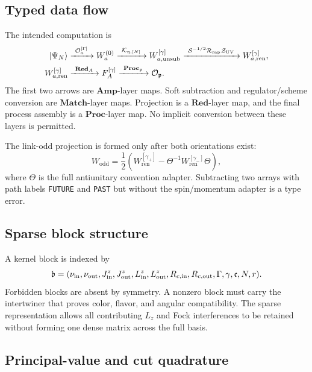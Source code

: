 \documentclass[11pt]{article}
\newcommand{\Amp}{\mathbf{Amp}}
\newcommand{\Match}{\mathbf{Match}}
\newcommand{\Red}{\mathbf{Red}}
\newcommand{\Proc}{\mathbf{Proc}}
\newcommand{\cO}{\mathcal O}
\newcommand{\cR}{\mathcal R}
\newcommand{\cS}{\mathcal S}
\newcommand{\cK}{\mathcal K}
\newcommand{\cZ}{\mathcal Z}
\newcommand{\unsub}{\mathrm{unsub}}
\newcommand{\ren}{\mathrm{ren}}
\newcommand{\odd}{\mathrm{odd}}
\newcommand{\rap}{\mathrm{rap}}
\newcommand{\UV}{\mathrm{UV}}
\begin{document}
\subsection{Typed data flow}

The intended computation is
\begin{align}
 |\Psi_N\rangle
 &\xrightarrow{\ \cO_{a}^{[\Gamma]}\ }
 W_{a}^{(0)}
 \xrightarrow{\ \cK_{\eta,[N]}\ }
 W_{a,\unsub}^{[\gamma]}
 \xrightarrow{\ \cS^{-1/2}\cR_{\rap}\cZ_{\UV}\ }
 W_{a,\ren}^{[\gamma]},
\notag\\
 W_{a,\ren}^{[\gamma]}
 &\xrightarrow{\ \Red_A\ }
 F_A^{[\gamma]}
 \xrightarrow{\ \Proc_{\mathfrak p}\ }
 \cO_{\mathfrak p}.
\label{eq:software-data-flow}
\end{align}
The first two arrows are \(\Amp\)-layer maps.  Soft subtraction and
regulator/scheme conversion are \(\Match\)-layer maps.  Projection is a
\(\Red\)-layer map, and the final process assembly is a \(\Proc\)-layer map.
No implicit conversion between these layers is permitted.

The link-odd projection is formed only after both orientations exist:
\begin{equation}
 W_{\odd}
 =\frac12\left(
   W_{\ren}^{[\gamma_+]}
  -\Theta^{-1}W_{\ren}^{[\gamma_-]}\Theta
 \right),
\label{eq:software-link-odd}
\end{equation}
where \(\Theta\) is the full antiunitary convention adapter.  Subtracting two
arrays with path labels \texttt{FUTURE} and \texttt{PAST} but without the
spin/momentum adapter is a type error.

\subsection{Sparse block structure}

A kernel block is indexed by
\begin{equation}
 \mathfrak b=
 (\nu_{\rm in},\nu_{\rm out},
  J^z_{\rm in},J^z_{\rm out},
  L^z_{\rm in},L^z_{\rm out},
  R_{c,\rm in},R_{c,\rm out},
  \Gamma,\gamma,\mathfrak c,N,r).
\label{eq:kernel-block-id}
\end{equation}
Forbidden blocks are absent by symmetry.  A nonzero block must carry the
intertwiner that proves color, flavor, and angular compatibility.  The sparse
representation allows all contributing \(L_z\) and Fock interferences to be
retained without forming one dense matrix across the full basis.

\subsection{Principal-value and cut quadrature}
\end{document}
